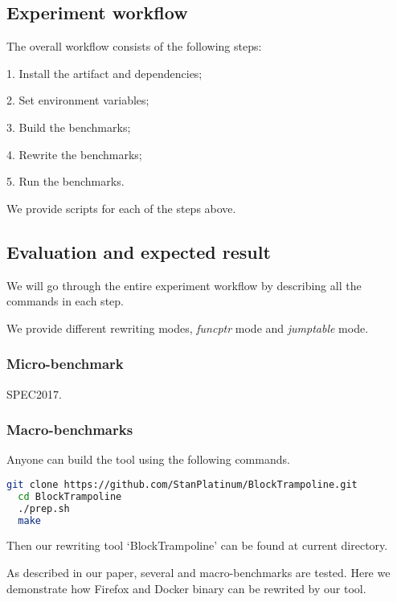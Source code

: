 \documentclass{sigplanconf}
\begin{document}
{%
\subsection{Experiment workflow}

The overall workflow consists of the following steps:

1. Install the artifact and dependencies;

2. Set environment variables;

3. Build the benchmarks;

4. Rewrite the benchmarks;

5. Run the benchmarks.

We provide scripts for each of the steps above.

\subsection{Evaluation and expected result}


We will go through the entire experiment workflow by describing all the commands in each step.

We provide different rewriting modes, \textit{funcptr} mode and \textit{jumptable} mode.






\subsubsection{Micro-benchmark}

SPEC2017.

\subsubsection{Macro-benchmarks}


Anyone can build the tool using the following commands.

\begin{lstlisting}[language=bash]
  git clone https://github.com/StanPlatinum/BlockTrampoline.git
  cd BlockTrampoline
  ./prep.sh
  make
\end{lstlisting}

Then our rewriting tool `BlockTrampoline' can be found at current directory.

As described in our paper, several and macro-benchmarks are tested. Here we demonstrate how Firefox and Docker binary can be rewrited by our tool.

}
\end{document}
